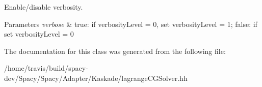\-Enable/disable verbosity. 


\begin{DoxyParams}{\-Parameters}
{\em verbose} & true\-: if verbosity\-Level = 0, set verbosity\-Level = 1; false\-: if set verbosity\-Level = 0 \\
\hline
\end{DoxyParams}


\-The documentation for this class was generated from the following file\-:\begin{DoxyCompactItemize}
\item 
/home/travis/build/spacy-\/dev/\-Spacy/\-Spacy/\-Adapter/\-Kaskade/lagrange\-C\-G\-Solver.\-hh\end{DoxyCompactItemize}

